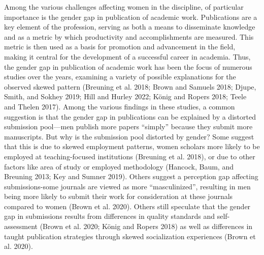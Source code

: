 \documentclass[
]{ccr}
\begin{document}
Among the various challenges affecting women in the discipline, of
particular importance is the gender gap in publication of academic work.
Publications are a key element of the profession, serving as both a
means to disseminate knowledge and as a metric by which productivity and
accomplishments are measured. This metric is then used as a basis for
promotion and advancement in the field, making it central for the
development of a successful career in academia. Thus, the gender gap in
publication of academic work has been the focus of numerous studies over
the years, examining a variety of possible explanations for the observed
skewed pattern (Breuning et al. 2018; Brown and Samuels 2018; Djupe,
Smith, and Sokhey 2019; Hill and Hurley 2022; König and Ropers 2018;
Teele and Thelen 2017). Among the various findings in these studies, a
common suggestion is that the gender gap in publications can be
explained by a distorted submission pool---men publish more papers
``simply'' because they submit more manuscripts. But why is the
submission pool distorted by gender? Some suggest that this is due to
skewed employment patterns, women scholars more likely to be employed at
teaching-focused institutions (Breuning et al. 2018), or due to other
factors like area of study or employed methodology (Hancock, Baum, and
Breuning 2013; Key and Sumner 2019). Others suggest a perception gap
affecting submissions-some journals are viewed as more ``masculinized'',
resulting in men being more likely to submit their work for
consideration at these journals compared to women (Brown et al. 2020).
Others still speculate that the gender gap in submissions results from
differences in quality standards and self-assessment (Brown et al. 2020;
König and Ropers 2018) as well as differences in taught publication
strategies through skewed socialization experiences (Brown et al. 2020).
\end{document}
